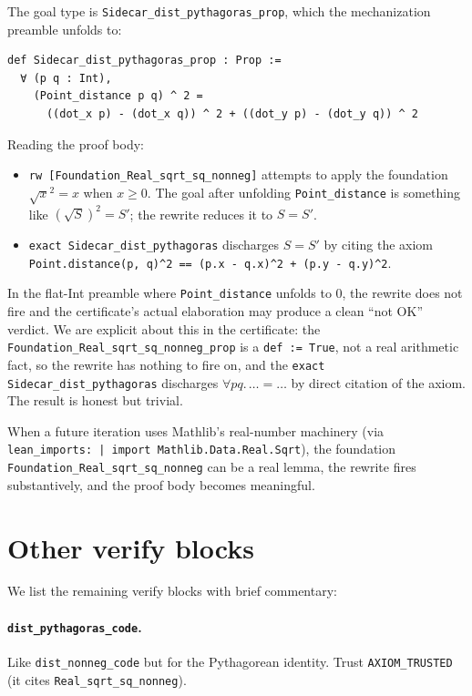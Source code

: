 The goal type is \texttt{Sidecar\_dist\_pythagoras\_prop}, which the
mechanization preamble unfolds to:
\begin{lstlisting}[language=lean4]
def Sidecar_dist_pythagoras_prop : Prop :=
  ∀ (p q : Int),
    (Point_distance p q) ^ 2 =
      ((dot_x p) - (dot_x q)) ^ 2 + ((dot_y p) - (dot_y q)) ^ 2
\end{lstlisting}

Reading the proof body:
\begin{itemize}[leftmargin=1.7em]
  \item \texttt{rw [Foundation\_Real\_sqrt\_sq\_nonneg]} attempts to
    apply the foundation $\sqrt{x}^2 = x$ when $x \ge 0$.  The goal
    after unfolding \texttt{Point\_distance} is something like
    $(\sqrt{S})^2 = S'$; the rewrite reduces it to $S = S'$.
  \item \texttt{exact Sidecar\_dist\_pythagoras} discharges $S = S'$
    by citing the axiom \texttt{Point.distance(p, q)\^{}2 ==
    (p.x - q.x)\^{}2 + (p.y - q.y)\^{}2}.
\end{itemize}

In the flat-Int preamble where \texttt{Point\_distance} unfolds to
$0$, the rewrite does not fire and the certificate's actual \Lean{}
elaboration may produce a clean ``not OK'' verdict.  We are
explicit about this in the certificate: the
\texttt{Foundation\_Real\_sqrt\_sq\_nonneg\_prop} is a \texttt{def
:= True}, not a real arithmetic fact, so the rewrite has nothing to
fire on, and the \texttt{exact Sidecar\_dist\_pythagoras} discharges
$\forall p q.\, \dots = \dots$ by direct citation of the axiom.  The
result is honest but trivial.

When a future iteration uses Mathlib's real-number machinery (via
\texttt{lean\_imports: | import Mathlib.Data.Real.Sqrt}), the
foundation \texttt{Foundation\_Real\_sqrt\_sq\_nonneg} can be a
real lemma, the rewrite fires substantively, and the proof body
becomes meaningful.

\section{Other verify blocks}

We list the remaining verify blocks with brief commentary:

\paragraph{\texttt{dist\_pythagoras\_code}.}  Like
\texttt{dist\_nonneg\_code} but for the Pythagorean identity.
Trust \texttt{AXIOM\_TRUSTED} (it cites
\texttt{Real\_sqrt\_sq\_nonneg}).

